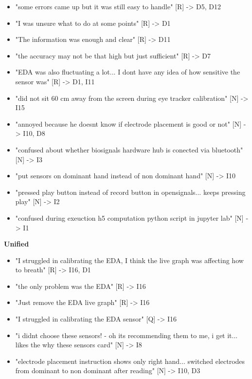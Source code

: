 \documentclass[
]{article}
\begin{document}
\begin{itemize}
\item
  "some errors came up but it was still easy to handle" {[}R{]} -\textgreater{} D5, D12
\item
  "I was unsure what to do at some points" {[}R{]} -\textgreater{} D1
\item
  "The information was enough and clear" {[}R{]} -\textgreater{} D11
\item
  "the accuracy may not be that high but just sufficient" {[}R{]} -\textgreater{} D7
\item
  "EDA was also fluctuating a lot... I don\textquotesingle t have any idea of how sensitive the sensor was" {[}R{]} -\textgreater{} D1, I11
\item
  "did not sit 60 cm away from the screen during eye tracker calibration" {[}N{]} -\textgreater{} I15
\item
  "annoyed because he doesnt know if electrode placement is good or not" {[}N{]} -\textgreater{} I10, D8
\item
  "confused about whether biosignals hardware hub is conected via bluetooth" {[}N{]} -\textgreater{} I3
\item
  "put sensors on dominant hand instead of non dominant hand" {[}N{]} -\textgreater{} I10
\item
  "pressed play button instead of record button in opensignals... keeps pressing play" {[}N{]} -\textgreater{} I2
\item
  "confused during exeuction h5 computation python script in jupyter lab" {[}N{]} -\textgreater{} I1
\end{itemize}

\textbf{Unified}

\begin{itemize}
\item
  "I struggled in calibrating the EDA, I think the live graph was affecting how to breath" {[}R{]} -\textgreater{} I16, D1
\item
  "the only problem was the EDA" {[}R{]} -\textgreater{} I16
\item
  "Just remove the EDA live graph" {[}R{]} -\textgreater{} I16
\item
  "I struggled in calibrating the EDA sensor" {[}Q{]} -\textgreater{} I16
\item
  "i didnt choose these sensors! - oh it\textquotesingle s recommending them to me, i get it... likes the why these sensors card" {[}N{]} -\textgreater{} I8
\item
  "electrode placement instruction shows only right hand... switched electrodes from dominant to non dominant after reading" {[}N{]} -\textgreater{} I10, D3
\end{itemize}
\end{document}

